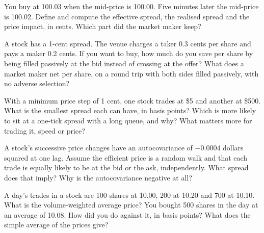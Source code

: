 \begin{question}\label{iq:iv2:markets-and-microstructure:4}
You buy at 100.03 when the mid-price is 100.00. Five minutes later the mid-price is 100.02. Define and compute the effective spread, the realised spread and the price impact, in cents. Which part did the market maker keep?
\end{question}

\begin{question}\label{iq:iv2:markets-and-microstructure:5}
A stock has a 1-cent spread. The venue charges a taker 0.3 cents per share and pays a maker 0.2 cents. If you want to buy, how much do you save per share by being filled passively at the bid instead of crossing at the offer? What does a market maker net per share, on a round trip with both sides filled passively, with no adverse selection?
\end{question}

\begin{question}\label{iq:iv2:markets-and-microstructure:6}
With a minimum price step of 1 cent, one stock trades at \$5 and another at \$500. What is the smallest spread each can have, in basis points? Which is more likely to sit at a one-tick spread with a long queue, and why? What matters more for trading it, speed or price?
\end{question}

\begin{question}\label{iq:iv2:markets-and-microstructure:7}
A stock's successive price changes have an autocovariance of $-0.0004$ dollars squared at one lag. Assume the efficient price is a random walk and that each trade is equally likely to be at the bid or the ask, independently. What spread does that imply? Why is the autocovariance negative at all?
\end{question}

\begin{question}\label{iq:iv2:markets-and-microstructure:8}
A day's trades in a stock are 100 shares at 10.00, 200 at 10.20 and 700 at 10.10. What is the volume-weighted average price? You bought 500 shares in the day at an average of 10.08. How did you do against it, in basis points? What does the simple average of the prices give?
\end{question}

